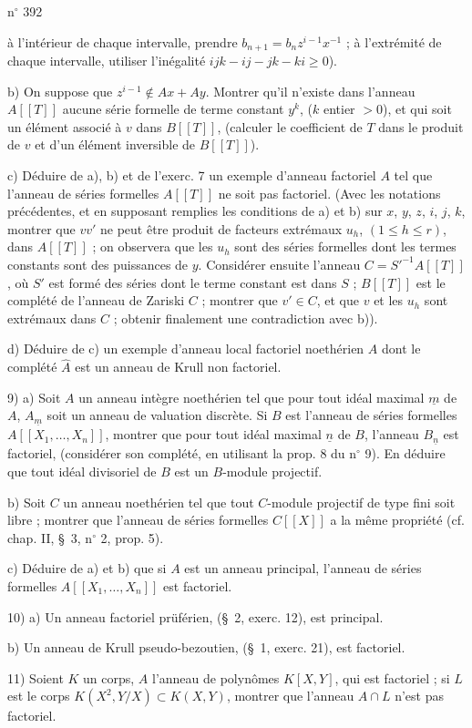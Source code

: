 \hfill n$^{\circ}$ 392

à l'intérieur de chaque intervalle, prendre $b_{n+1}=b_nz^{i-1}x^{-1}$ ; à l'extrémité de chaque intervalle, utiliser l'inégalité $ijk-ij-jk-ki\geq 0$).

b) On suppose que $z^{i-1}\notin Ax+Ay$. Montrer qu'il n'existe dans l'anneau $A[[T]]$ aucune série formelle de terme constant $y^k$, ($k$ entier $>0$), et qui soit un élément associé à $v$ dans $B[[T]]$, (calculer le coefficient de $T$ dans le produit de $v$ et d'un élément inversible de $B[[T]]$).

c) Déduire de a), b) et de l'exerc. 7 un exemple d'anneau factoriel $A$ tel que l'anneau de séries formelles $A[[T]]$ ne soit pas factoriel. (Avec les notations précédentes, et en supposant remplies les conditions de a) et b) sur $x$, $y$, $z$, $i$, $j$, $k$, montrer que $vv'$ ne peut être produit de facteurs extrémaux $u_h$, $(1\leq h\leq r)$, dans $A[[T]]$ ; on observera que les $u_h$ sont des séries formelles dont les termes constants sont des puissances de $y$. Considérer ensuite l'anneau $C=S'^{-1}A[[T]]$, où $S'$ est formé des séries dont le terme constant est dans $S$ ; $B[[T]]$ est le complété de l'anneau de Zariski $C$ ; montrer que $v'\in C$, et que $v$ et les $u_h$ sont extrémaux dans $C$ ; obtenir finalement une contradiction avec b)).

d) Déduire de c) un exemple d'anneau local factoriel noethérien $A$ dont le complété $\hat A$ est un anneau de Krull non factoriel.

9) \qquad a) Soit $A$ un anneau intègre noethérien tel que pour tout idéal maximal $\underline{m}$ de $A$, $A_{\underline{m}}$ soit un anneau de valuation discrète. Si $B$ est l'anneau de séries formelles $A[[X_1,\ldots,X_n]]$, montrer que pour tout idéal maximal $\underline{n}$ de $B$, l'anneau $B_{\underline{n}}$ est factoriel, (considérer son complété, en utilisant la prop. 8 du n$^{\circ}$ 9). En déduire que tout idéal divisoriel de $B$ est un $B$-module projectif.

b) Soit $C$ un anneau noethérien tel que tout $C$-module projectif de type fini soit libre ; montrer que l'anneau de séries formelles $C[[X]]$ a la même propriété (cf. chap. II, \S~3, n$^{\circ}$ 2, prop. 5).

c) Déduire de a) et b) que si $A$ est un anneau principal, l'anneau de séries formelles $A[[X_1,\ldots,X_n]]$ est factoriel.

10) \qquad a) Un anneau factoriel prüférien, (\S~2, exerc. 12), est principal.

b) Un anneau de Krull pseudo-bezoutien, (\S~1, exerc. 21), est factoriel.

11) Soient $K$ un corps, $A$ l'anneau de polynômes $K[X,Y]$, qui est factoriel ; si $L$ est le corps $K(X^2,Y/X)\subset K(X,Y)$, montrer que l'anneau $A\cap L$ n'est pas factoriel.
